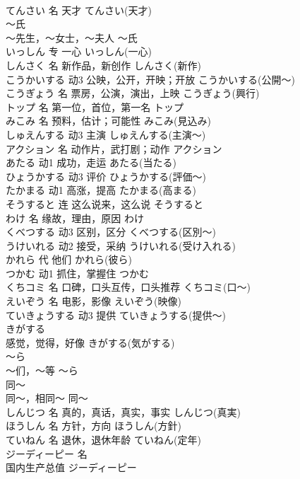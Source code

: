 \documentclass[8pt]{extreport}
\begin{document}
\begin{CJK}{UTF8}{min}
\\	てんさい	名	天才	てんさい(天才)	
\\	～氏	
\\	～先生，～女士，～夫人	～氏	
\\	いっしん	专	一心	いっしん(一心)	
\\	しんさく	名	新作品，新创作	しんさく(新作)	
\\	こうかいする	动3	公映，公开，开映；开放	こうかいする(公開～)	
\\	こうぎょう	名	票房，公演，演出，上映	こうぎょう(興行)	
\\	トップ	名	第一位，首位，第一名	トップ	
\\	みこみ	名	预料，估计；可能性	みこみ(見込み)	
\\	しゅえんする	动3	主演	しゅえんする(主演～)	
\\	アクション	名	动作片，武打剧；动作	アクション	
\\	あたる	动1	成功，走运	あたる(当たる)	
\\	ひょうかする	动3	评价	ひょうかする(評価～)	
\\	たかまる	动1	高涨，提高	たかまる(高まる)	
\\	そうすると	连	这么说来，这么说	そうすると	
\\	わけ	名	缘故，理由，原因	わけ	
\\	くべつする	动3	区别，区分	くべつする(区別～)	
\\	うけいれる	动2	接受，采纳	うけいれる(受け入れる)	
\\	かれら	代	他们	かれら(彼ら)	
\\	つかむ	动1	抓住，掌握住	つかむ	
\\	くちコミ	名	口碑，口头互传，口头推荐	くちコミ(口～)	
\\	えいぞう	名	电影，影像	えいぞう(映像)	
\\	ていきょうする	动3	提供	ていきょうする(提供～)	
\\	きがする	
\\	感觉，觉得，好像	きがする(気がする)	
\\	～ら	
\\	～们，～等	～ら	
\\	同～	
\\	同～，相同～	同～	
\\	しんじつ	名	真的，真话，真实，事实	しんじつ(真実)	
\\	ほうしん	名	方针，方向	ほうしん(方針)	
\\	ていねん	名	退休，退休年龄	ていねん(定年)	
\\	ジーディーピー	名	
\\	国内生产总值	ジーディーピー

\end{CJK}
\end{document}
